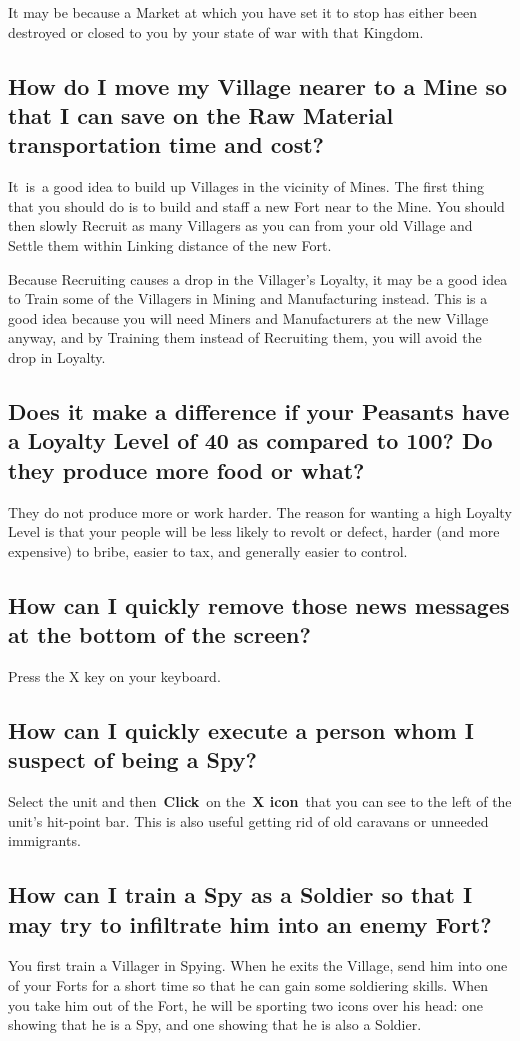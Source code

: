It may be because a Market at which you have set it to stop has either been destroyed or closed to you by your state of war with that Kingdom.

\subsection{How do I move my Village nearer to a Mine so that I can save on the Raw Material transportation time and cost?}

It is a good idea to build up Villages in the vicinity of Mines. The first thing that you should do is to build and staff a new Fort near to the Mine. You should then slowly Recruit as many Villagers as you can from your old Village and Settle them within Linking distance of the new Fort.

Because Recruiting causes a drop in the Villager’s Loyalty, it may be a good idea to Train some of the Villagers in Mining and Manufacturing instead. This is a good idea because you will need Miners and Manufacturers at the new Village anyway, and by Training them instead of Recruiting them, you will avoid the drop in Loyalty.

\subsection{Does it make a difference if your Peasants have a Loyalty Level of 40 as compared to 100? Do they produce more food or what?}

They do not produce more or work harder. The reason for wanting a high Loyalty Level is that your people will be less likely to revolt or defect, harder (and more expensive) to bribe, easier to tax, and generally easier to control.

\subsection{How can I quickly remove those news messages at the bottom of the screen?}

Press the X key on your keyboard.

\subsection{How can I quickly execute a person whom I suspect of being a Spy?}

Select the unit and then \textbf{Click} on the \textbf{X icon} that you can see to the left of the unit’s hit-point bar. This is also useful getting rid of old caravans or unneeded immigrants.

\subsection{How can I train a Spy as a Soldier so that I may try to infiltrate him into an enemy Fort?}

You first train a Villager in Spying. When he exits the Village, send him into one of your Forts for a short time so that he can gain some soldiering skills. When you take him out of the Fort, he will be sporting two icons over his head: one showing that he is a Spy, and one showing that he is also a Soldier.